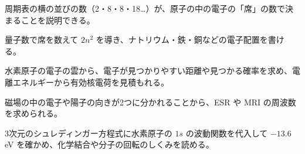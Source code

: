 \begin{furikaeri}
\begin{checklist}
\item 周期表の横の並びの数（2・8・8・18…）が、原子の中の電子の「席」の数で決まることを説明できる。
\item 量子数で席を数えて $2n^2$ を導き、ナトリウム・鉄・銅などの電子配置を書ける。
\item 水素原子の電子の雲から、電子が見つかりやすい距離や見つかる確率を求め、電離エネルギーから有効核電荷を見積もれる。
\item 磁場の中の電子や陽子の向きが2つに分かれることから、ESR や MRI の周波数を求められる。
\item 3次元のシュレディンガー方程式に水素原子の $1s$ の波動関数を代入して $-13.6$ eV を確かめ、化学結合や分子の回転のしくみを読める。
\end{checklist}
\end{furikaeri}
